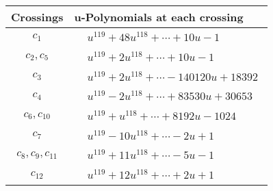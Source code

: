 \documentclass[1p]{elsarticle_modified}
\theoremstyle{definition}
\begin{document}
\begin{tabular}{m{50pt}|m{274pt}}
Crossings & \hspace{64pt}u-Polynomials at each crossing \\
\hline $$\begin{aligned}c_{1}\end{aligned}$$&$\begin{aligned}
&u^{119}+48 u^{118}+\cdots+10 u-1
\end{aligned}$\\
\hline $$\begin{aligned}c_{2},c_{5}\end{aligned}$$&$\begin{aligned}
&u^{119}+2 u^{118}+\cdots+10 u-1
\end{aligned}$\\
\hline $$\begin{aligned}c_{3}\end{aligned}$$&$\begin{aligned}
&u^{119}+2 u^{118}+\cdots-140120 u+18392
\end{aligned}$\\
\hline $$\begin{aligned}c_{4}\end{aligned}$$&$\begin{aligned}
&u^{119}-2 u^{118}+\cdots+83530 u+30653
\end{aligned}$\\
\hline $$\begin{aligned}c_{6},c_{10}\end{aligned}$$&$\begin{aligned}
&u^{119}+u^{118}+\cdots+8192 u-1024
\end{aligned}$\\
\hline $$\begin{aligned}c_{7}\end{aligned}$$&$\begin{aligned}
&u^{119}-10 u^{118}+\cdots-2 u+1
\end{aligned}$\\
\hline $$\begin{aligned}c_{8},c_{9},c_{11}\end{aligned}$$&$\begin{aligned}
&u^{119}+11 u^{118}+\cdots-5 u-1
\end{aligned}$\\
\hline $$\begin{aligned}c_{12}\end{aligned}$$&$\begin{aligned}
&u^{119}+12 u^{118}+\cdots+2 u+1
\end{aligned}$\\
\hline
\end{tabular}\\~\\
\end{document}
